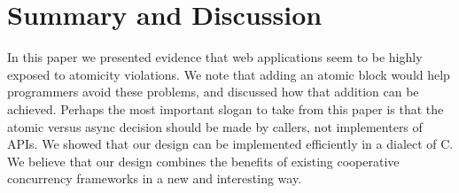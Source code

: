 \documentclass[acmsmall,anonymous,review]{acmart}\settopmatter{printfolios=true,printccs=false,printacmref=false}
\begin{document}





\section{Summary and Discussion}

In this paper we presented evidence that web applications seem to be highly exposed to atomicity violations.
We note that adding an atomic block would help programmers avoid these problems, and discussed how that addition can be achieved.
Perhaps the most important slogan to take from this paper is that the atomic versus async decision should be made by callers, not implementers of APIs.
We showed that our design can be implemented efficiently in a dialect of C.
We believe that our design combines the benefits of existing cooperative concurrency frameworks in a new and interesting way.


\end{document}

